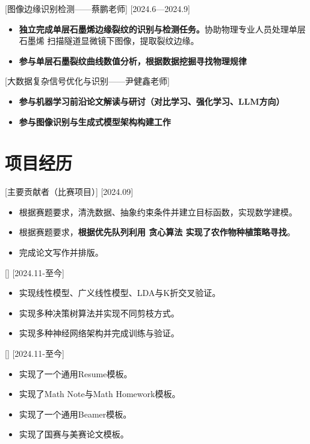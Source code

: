 \documentclass{resume}
\begin{document}
[图像边缘识别检测——蔡鹏老师]
[2024.6—2024.9] 

\begin{itemize}
  \item \textbf{独立完成单层石墨烯边缘裂纹的识别与检测任务。}协助物理专业人员处理单层石墨烯
  扫描隧道显微镜下图像，提取裂纹边缘。
  \item \textbf{参与单层石墨裂纹曲线数值分析，根据数据挖掘寻找物理规律}
\end{itemize}

[大数据复杂信号优化与识别——尹健鑫老师]
\begin{itemize}
  \item \textbf{参与机器学习前沿论文解读与研讨（对比学习、强化学习、LLM方向）}
  \item \textbf{参与图像识别与生成式模型架构构建工作}
\end{itemize}

\section{项目经历}

[主要贡献者（比赛项目）]
[2024.09]

\begin{itemize}
  \item 根据赛题要求，清洗数据、抽象约束条件并建立目标函数，实现数学建模。
  \item 根据赛题要求，\textbf{根据优先队列利用 贪心算法 实现了农作物种植策略寻找}。
  \item 完成论文写作并排版。
\end{itemize}

[]
[2024.11-至今]
\begin{itemize}
  \item 实现线性模型、广义线性模型、LDA与K折交叉验证。
  \item 实现多种决策树算法并实现不同剪枝方式。
  \item 实现多种神经网络架构并完成训练与验证。
\end{itemize}

[]
[2024.11-至今]
\begin{itemize}
  \item 实现了一个通用Resume模板。
  \item 实现了Math Note与Math Homework模板。
  \item 实现了一个通用Beamer模板。
  \item 实现了国赛与美赛论文模板。
\end{itemize}
\end{document}
